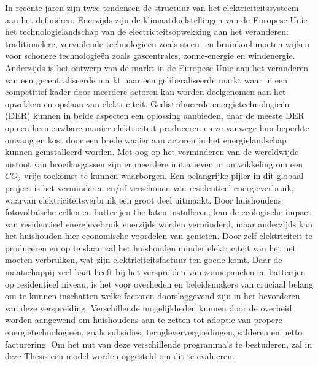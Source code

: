 \documentclass[master=ene,english]{kulemt}
\begin{document}
\begin{abstract*}
 In recente jaren zijn twee tendensen de structuur van het elektriciteitssysteem aan het defini\"{e}ren. Enerzijds zijn de klimaatdoelstellingen van de Europese Unie het technologielandschap van de electricteitsopwekking aan het veranderen: traditionelere, vervuilende technologie\"{e}n zoals steen -en bruinkool moeten wijken voor schonere technologie\"{e}n zoals gascentrales, zonne-energie en windenergie. Anderzijds is het ontwerp van de markt in de Europese Unie aan het veranderen van een gecentraliseerde markt naar een geliberaliseerde markt waar in een competitief kader door meerdere actoren kan worden deelgenomen aan het opwekken en opslaan van elektriciteit. Gedistribueerde energietechnologie\"{e}n (DER) kunnen in beide aspecten een oplossing aanbieden, daar de meeste DER op een hernieuwbare manier elektriciteit produceren en ze vanwege hun beperkte omvang en kost door een brede waaier aan actoren in het energielandschap kunnen ge\"{i}nstalleerd worden. 
 \newline
 Met oog op het verminderen van de wereldwijde uistoot van broeikasgassen zijn er meerdere initiatieven in ontwikkeling om een $CO_2$ vrije toekomst te kunnen waarborgen. Een belangrijke pijler in dit globaal project is het verminderen en/of verschonen van residentieel energieverbruik, waarvan elektriciteitsverbruik een groot deel uitmaakt. Door huishoudens fotovoltaïsche cellen en batterijen the laten installeren, kan de ecologische impact van residentieel energievebruik enerzijds worden verminderd, maar anderzijds kan het huishouden hier economische voordelen van genieten. Door zelf elektriciteit te produceren en op te slaan zal het huishouden minder elektriciteit van het net moeten verbruiken, wat zijn elektriciteitsfactuur ten goede komt. 
   \newline \noindent
 Daar de maatschappij veel baat heeft bij het verspreiden van zonnepanelen en batterijen op residentieel niveau, is het voor overheden en beleidsmakers van cruciaal belang om te kunnen inschatten welke factoren doorslaggevend zijn in het bevorderen van deze verspreiding. Verschillende mogelijkheden kunnen door de overheid worden aangewend om huishoudens aan te zetten tot adoptie van propere energietechnologieën, zoals subsidies, terugleververgoedingen, salderen en netto facturering. Om het nut van deze verschillende programma's te bestuderen, zal in deze Thesis een model worden opgesteld om dit te evalueren.
   \newline \noindent

\end{abstract*}
\end{document}
